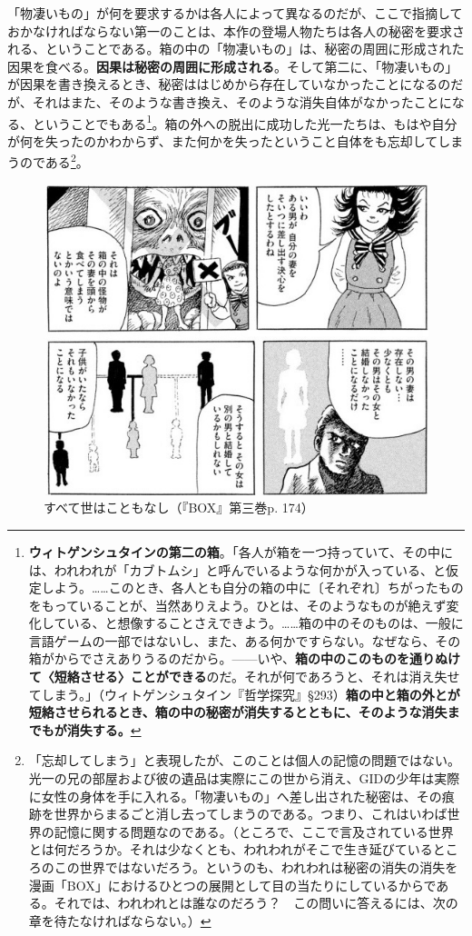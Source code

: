 \documentclass[a4paper]{jsarticle}
\begin{document}
「物凄いもの」が何を要求するかは各人によって異なるのだが、ここで指摘しておかなければならない第一のことは、本作の登場人物たちは各人の秘密を要求される、ということである。箱の中の「物凄いもの」は、秘密の周囲に形成された因果を食べる。\textbf{因果は秘密の周囲に形成される}。そして第二に、「物凄いもの」が因果を書き換えるとき、秘密ははじめから存在していなかったことになるのだが、それはまた、そのような書き換え、そのような消失自体がなかったことになる、ということでもある\footnote{\textbf{ウィトゲンシュタインの第二の箱}。「各人が箱を一つ持っていて、その中には、われわれが「カブトムシ」と呼んでいるような何かが入っている、と仮定しよう。……このとき、各人とも自分の箱の中に〔それぞれ〕ちがったものをもっていることが、当然ありえよう。ひとは、そのようなものが絶えず変化している、と想像することさえできよう。……箱の中のそのものは、一般に言語ゲームの一部ではないし、また、ある何かですらない。なぜなら、その箱がからでさえありうるのだから。------いや、\textbf{箱の中のこのものを通りぬけて〈短絡させる〉ことができる}のだ。それが何であろうと、それは消え失せてしまう。」（ウィトゲンシュタイン『哲学探究』§293）\textbf{箱の中と箱の外とが短絡させられるとき、箱の中の秘密が消失するとともに、そのような消失までもが消失する。}}。箱の外への脱出に成功した光一たちは、もはや自分が何を失ったのかわからず、また何かを失ったということ自体をも忘却してしまうのである\footnote{「忘却してしまう」と表現したが、このことは個人の記憶の問題ではない。光一の兄の部屋および彼の遺品は実際にこの世から消え、GIDの少年は実際に女性の身体を手に入れる。「物凄いもの」へ差し出された秘密は、その痕跡を世界からまるごと消し去ってしまうのである。つまり、これはいわば世界の記憶に関する問題なのである。（ところで、ここで言及されている世界とは何だろうか。それは少なくとも、われわれがそこで生き延びているところのこの世界ではないだろう。というのも、われわれは秘密の消失の消失を漫画「BOX」におけるひとつの展開として目の当たりにしているからである。それでは、われわれとは誰なのだろう？　この問いに答えるには、次の章を待たなければならない。）}。

\begin{figure}[h]
	\centering
	\includegraphics[clip, scale=0.7]{因果}
	\caption{すべて世はこともなし（『BOX』第三巻p. 174）}
\end{figure}
\end{document}
